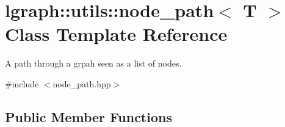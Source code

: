\hypertarget{classlgraph_1_1utils_1_1node__path}{}\section{lgraph\+:\+:utils\+:\+:node\+\_\+path$<$ T $>$ Class Template Reference}
\label{classlgraph_1_1utils_1_1node__path}


A path through a grpah seen as a list of nodes.  




{\ttfamily \#include $<$node\+\_\+path.\+hpp$>$}

\subsection*{Public Member Functions}
